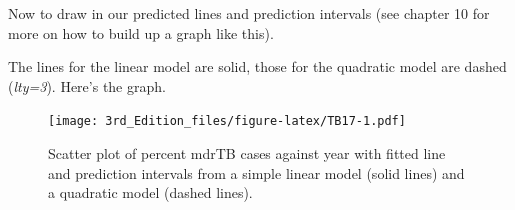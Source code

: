\documentclass[
]{book}
\newenvironment{Shaded}{\begin{snugshade}}{\end{snugshade}}
\newcommand{\DataTypeTok}[1]{\textcolor[rgb]{0.13,0.29,0.53}{#1}}
\newcommand{\DecValTok}[1]{\textcolor[rgb]{0.00,0.00,0.81}{#1}}
\newcommand{\KeywordTok}[1]{\textcolor[rgb]{0.13,0.29,0.53}{\textbf{#1}}}
\newcommand{\NormalTok}[1]{#1}
\newcommand{\OperatorTok}[1]{\textcolor[rgb]{0.81,0.36,0.00}{\textbf{#1}}}
\newcommand{\StringTok}[1]{\textcolor[rgb]{0.31,0.60,0.02}{#1}}
\begin{document}
Now to draw in our predicted lines and prediction intervals (see chapter 10 for more on how to build up a graph like this).

\begin{Shaded}
\end{Shaded}

The lines for the linear model are solid, those for the quadratic model are dashed (\emph{lty=3}). Here's the graph.

\begin{figure}
\centering
\texttt{[image: 3rd\_Edition\_files/figure-latex/TB17-1.pdf]}
\caption{\label{fig:TB17}Scatter plot of percent mdrTB cases against year with fitted line and prediction intervals from a simple linear model (solid lines) and a quadratic model (dashed lines).}
\end{figure}
\end{document}
